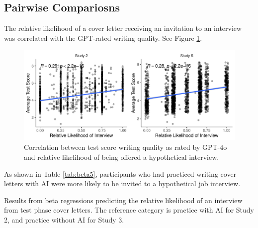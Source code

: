 \documentclass[11pt]{report}
\begin{document}
\begin{append}
\subsection{Pairwise Compariosns}
The relative likelihood of a cover letter receiving an invitation to an interview was correlated with the GPT-rated writing quality. See Figure \ref{fig:correlations5}.

\begin{figure}
    \centering
    \includegraphics[width=0.5\linewidth]{correlations5.pdf}
    \caption{Correlation between test score writing quality as rated by GPT-4o and relative likelihood of being offered a hypothetical interview.}
    \label{fig:correlations5}
\end{figure}

As shown in Table \ref{tab:beta5}, participants who had practiced writing cover letters with AI were more likely to be invited to a hypothetical job interview.
\begin{table}[h]
    \centering
    \caption{Results from beta regressions predicting the relative likelihood of an interview from test phase cover letters. The reference category is practice with AI for Study 2, and practice without AI for Study 3.}


\end{table}
\end{append}
\end{document}
